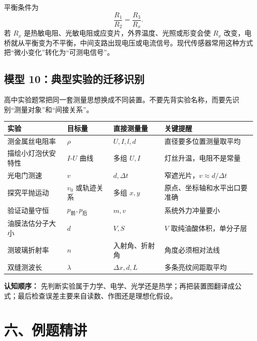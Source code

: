 平衡条件为
\[
\boxed{\frac{R_1}{R_2}=\frac{R_3}{R_x}}.
\]
若 $R_x$ 是热敏电阻、光敏电阻或应变片，外界温度、光照或形变会使 $R_x$ 改变，电桥就从平衡变为不平衡，中间支路出现电压或电流信号。现代传感器常用这种方式把“微小变化”转化为“可测电信号”。

\subsection*{模型 10：典型实验的迁移识别}

高中实验题常把同一套测量思想换成不同装置。不要先背实验名称，而要先识别“测量对象”和“间接关系”。

\pagebreak
\begin{center}


\label{fig:classic-experiment-setups}
\end{center}

\begin{center}
\small
\begin{tabular}{llll}
\toprule
实验 & 目标量 & 直接测量量 & 关键提醒 \\
\midrule
测金属丝电阻率 & $\rho$ & $U,I,l,d$ & 直径要多位置测量取平均 \\
描绘小灯泡伏安特性 & $I$-$U$ 曲线 & 多组 $U,I$ & 灯丝升温，电阻不是常量 \\
光电门测速 & $v$ & $d,\Delta t$ & 窄遮光片，$v\approx d/\Delta t$ \\
探究平抛运动 & $v_0$ 或轨迹关系 & 多组 $x,y$ & 原点、坐标轴和水平出口要准确 \\
验证动量守恒 & $p_{\text{前}},p_{\text{后}}$ & $m,v$ & 系统外力冲量要小 \\
油膜法估分子大小 & $d$ & $V,S$ & $V$ 取纯油酸体积，单分子层 \\
测玻璃折射率 & $n$ & 入射角、折射角 & 角度必须相对法线 \\
双缝测波长 & $\lambda$ & $\Delta x,d,L$ & 多条亮纹间距取平均 \\
\bottomrule
\end{tabular}
\end{center}

\textbf{认知顺序：} 先判断实验属于力学、电学、光学还是热学；再把装置图翻译成公式；最后检查误差主要来自读数、作图还是理想化假设。

\section*{六、例题精讲}

